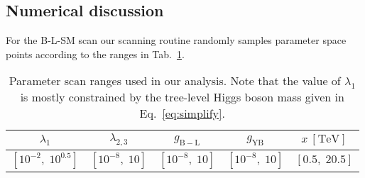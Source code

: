 \subsection{Numerical discussion}

For the B-L-SM scan our scanning routine randomly samples parameter space points according to the ranges in Tab.~\ref{tab:scan}.
%
\begin{table}[H]
	\begin{center}
		\begin{tabular}{ccccc}
			\toprule                     
			$\lambda_{1}$ & $\lambda_{2,3}$ & $g_{\mathrm{B-L}}$ & $g_{\mathrm{YB}}$ & $x~{\mathrm{[TeV]}}$  
			\\       
						\midrule 
			$\left[10^{-2},\; 10^{0.5}
			\right]$ 			    							& $\left[10^{-8},\; 10
			\right]$ 			    							& $\left[10^{-8},\; 10
			\right]$		& $\left[10^{-8},\; 10
			\right]$	&	$\left[0.5,\; 20.5
			\right]$ 	\\
			\bottomrule
		\end{tabular}  
		\caption{Parameter scan ranges used in our analysis. Note that the value of $\lambda_1$ is mostly constrained by the tree-level Higgs boson mass given in Eq.~\eqref{eq:simplify}. 
		}
		\label{tab:scan}
	\end{center}
\end{table}
%  
%
%
%
%
%
% 
%


